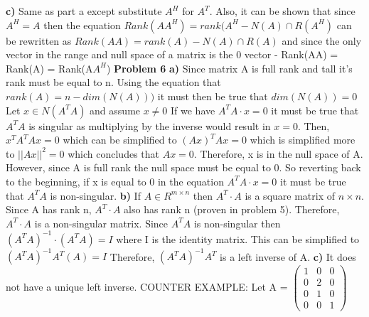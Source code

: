 \documentclass[12pt]{article}
\begin{document}
\newline
\newline
\textbf{c)}
\newline
Same as part a except substitute $A^{H}$ for $A^{T}$. Also, it can be shown that since $A^{H} = A$ then the equation $Rank(AA^{H}) = rank(A^{H} - N(A) \cap R(A^{H})$ can be rewritten as $Rank(AA) = rank(A) - N(A) \cap R(A)$ and since the only vector in the range and null space of a matrix is the 0 vector - Rank(AA) = Rank(A) = Rank(A$A^{H}$)
\newline
\textbf{Problem 6}
\newline
\textbf{a)}
\newline
Since matrix A is full rank and tall it's rank must be equal to n. Using the equation that $rank(A) = n - dim(N(A)))$ it must then be true that $dim(N(A)) = 0$
\newline
Let $x \in N(A^{T}A)$ and assume $x \neq 0$
\newline
If we have $A^{T}A \cdot x = 0$ it must be true that $A^{T}A$ is singular as multiplying by the inverse would result in $x = 0$.
\newline
Then, $x^{T}A^{T}Ax = 0$ which can be simplified to $(Ax)^{T}Ax = 0$ which is simplified more to $||Ax||^{2} = 0$ which concludes that $Ax = 0$.
\newline
Therefore, x is in the null space of A. However, since A is full rank the null space must be equal to 0. So reverting back to the beginning, if x is equal to 0 in the equation $A^{T}A \cdot x = 0$ it must be true that $A^{T}A$ is non-singular.
\newline
\textbf{b)}
\newline
If $A \in R^{m \times n}$ then $A^{T} \cdot A$ is a square matrix of $n \times n$. Since A has rank n, $A^{T} \cdot A$ also has rank n (proven in problem 5). Therefore, $A^{T} \cdot A$ is a non-singular matrix.
\newline
Since $A^{T} A$ is non-singular then  $(A^{T} A)^{-1} \cdot (A^{T} A)= I$ where I is the identity matrix. This can be simplified to $(A^{T} A)^{-1} A^{T}(A)= I$
\newline
Therefore, $(A^{T}A)^{-1} A^{T}$ is a left inverse of A.
\newline
\textbf{c)}
\newline
It does not have a unique left inverse.
\newline
COUNTER EXAMPLE: Let A = $\left(\begin{array}{ccc} 1 & 0 & 0  \\ 0 & 2 & 0 \\ 0 & 1 & 0 \\ 0 & 0 & 1\end{array}\right)$
\end{document}
